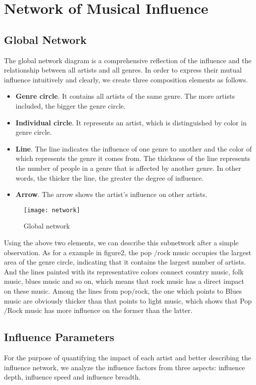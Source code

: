 \documentclass{mcmthesis}
\begin{document}
\section{Network of Musical Influence}
\subsection{Global Network} 
The global network diagram is a comprehensive reflection of the influence and the relationship between all artists and all genres. In order to express their mutual influence intuitively and clearly, we create three composition elements as follows.
\begin{itemize}
	\item \textbf{Genre circle}. It contains all artists of the same genre. The more artists included, the bigger the genre circle.
	\item \textbf{Individual circle}. It represents an artist, which is distinguished by color in genre circle.
	\item \textbf{Line}. The line indicates the influence of one genre to another and  the color of which represents the genre it comes from. The thickness of the line represents the number of people in a genre that is affected by another genre. In other words, the thicker the line, the greater the degree of influence.
	\item \textbf{Arrow}. The arrow shows the artist’s influence on other artists.
\end{itemize}
\begin{figure}[H]%
	\small
	\centering
	\texttt{[image: network]}%
	\caption{Global network}\label{fig:7}%
\end{figure}
Using the above two elements, we can describe this subnetwork after a simple observation. As for a example in figure2, the pop
$/$rock music occupies the largest area of the genre circle, indicating that it contains the largest number of artists. And the lines painted with its representative colors connect country music, folk music, blues music and so on, which means that rock music has a direct impact on these music. Among the lines from  pop$/$rock, the one which points to Blues music are obviously thicker than that points to light music, which shows that Pop$/$Rock music has more influence on the former than the latter.

\subsection{Influence Parameters}
For the purpose of quantifying the impact of each artist and better describing the influence network, we analyze the influence factors from three aspects: influence depth, influence speed and influence breadth.
\end{document}
